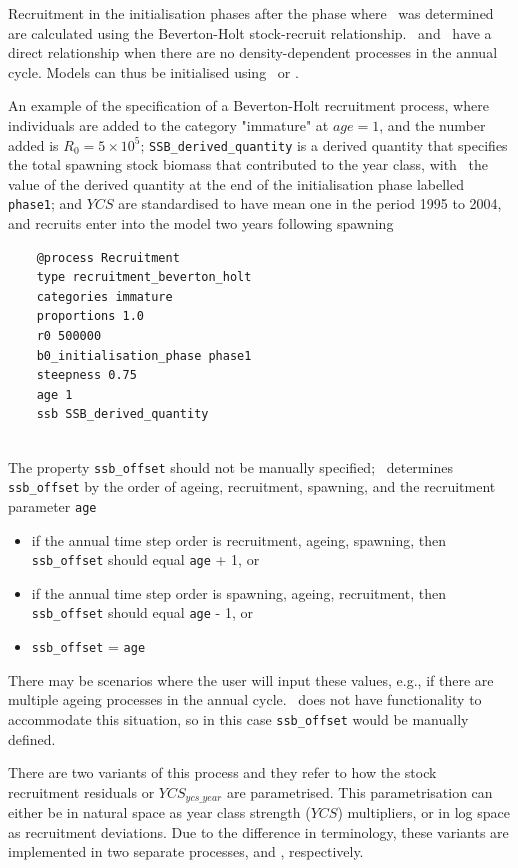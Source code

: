 Recruitment in the initialisation phases after the phase where \Bzero\ was determined are calculated using the Beverton-Holt stock-recruit relationship. \Rzero\ and \Bzero\ have a direct relationship when there are no density-dependent processes in the annual cycle. Models can thus be initialised using \Bzero\ or \Rzero.

An example of the specification of a Beverton-Holt recruitment process, where individuals are added to the category "immature" at $age=1$, and the number added is $R_0=5 \times 10^5$; \texttt{SSB\_derived\_quantity} is a derived quantity that specifies the total spawning stock biomass that contributed to the year class, with \Bzero\ the value of the derived quantity at the end of the initialisation phase labelled \texttt{phase1}; and $YCS$ are standardised to have mean one in the period 1995 to 2004, and recruits enter into the model two years following spawning

{\small{\begin{verbatim}
	@process Recruitment
	type recruitment_beverton_holt
	categories immature
	proportions 1.0
	r0 500000
	b0_initialisation_phase phase1
	steepness 0.75
	age 1
	ssb SSB_derived_quantity
	
\end{verbatim}}}

The property \texttt{ssb\_offset} should not be manually specified; \CNAME~determines \texttt{ssb\_offset} by the order of ageing, recruitment, spawning, and the recruitment parameter \texttt{age}

\begin{itemize}
	\item if the annual time step order is recruitment, ageing, spawning, then \texttt{ssb\_offset} should equal \texttt{age} + 1, or
	\item if the annual time step order is spawning, ageing, recruitment, then \texttt{ssb\_offset} should equal \texttt{age} - 1, or
	\item \texttt{ssb\_offset} = \texttt{age}
\end{itemize}

There may be scenarios where the user will input these values, e.g., if there are multiple ageing processes in the annual cycle. \CNAME~does not have functionality to accommodate this situation, so in this case \texttt{ssb\_offset} would be manually defined.

There are two variants of this process and they refer to how the stock recruitment residuals or $YCS_{ycs\_year}$ are parametrised. This parametrisation can either be in natural space as year class strength ($YCS$) multipliers, or in log space as recruitment deviations. Due to the difference in terminology, these variants are implemented in two separate processes,  and , respectively.

